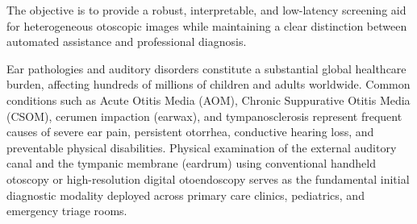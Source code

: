 \documentclass[12pt,a4paper]{report}
\begin{document}
The objective is to provide a robust, interpretable, and low-latency screening aid for heterogeneous otoscopic images while maintaining a clear distinction between automated assistance and professional diagnosis.

\iffalse

Ear pathologies and auditory disorders constitute a substantial global healthcare burden, affecting hundreds of millions of children and adults worldwide. Common conditions such as Acute Otitis Media (AOM), Chronic Suppurative Otitis Media (CSOM), cerumen impaction (earwax), and tympanosclerosis represent frequent causes of severe ear pain, persistent otorrhea, conductive hearing loss, and preventable physical disabilities. Physical examination of the external auditory canal and the tympanic membrane (eardrum) using conventional handheld otoscopy or high-resolution digital otoendoscopy serves as the fundamental initial diagnostic modality deployed across primary care clinics, pediatrics, and emergency triage rooms.
\end{document}
